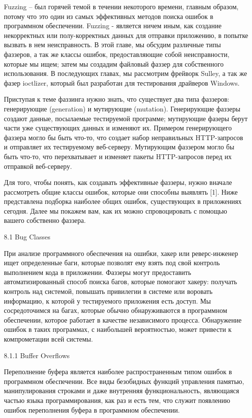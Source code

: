 \documentclass[12pt]{book}
\begin{document}
Fuzzing – был горячей темой в течении некоторого времени, главным образом, потому что это один из самых эффективных методов поиска ошибок в программном обеспечении. Fuzzing - является ничем иным, как создание некорректных или полу-корректных данных для отправки приложению, в попытке вызвать в нем неисправность. В этой главе, мы обсудим различные типы фаззеров, а так же классы ошибок, предоставляющие собой неисправности, которые мы ищем; затем мы создадим файловый фаззер для собственного использования. В последующих главах, мы рассмотрим фрейворк Sulley, а так же фазер ioctlizer, который был разработан для тестирования драйверов Windows.

Приступая к теме фаззинга нужно знать, что существует два типа фаззеров: генерирующие (generation) и мутирующие (mutation). Генерирующие фаззеры создают данные, посылаемые тестируемой программе; мутирующие фазеры берут части уже существующих данных и изменяют их. Примером генерирующего фаззера могло бы быть что-то, что создает набор неправильных HTTP-запросов и отправляет их тестируемому веб-серверу. Мутирующим фаззером могло бы быть что-то, что перехватывает и изменяет пакеты HTTP-запросов перед их отправкой веб-серверу. 

Для того, чтобы понять, как создавать эффективные фаззеры, нужно вначале рассмотреть общие классы ошибок, которые они способны выявлять [1]. Ниже представлена подборка наиболее общих ошибок, существующих в приложениях сегодня. Далее мы покажем вам, как их можно спровоцировать с помощью вашего собственно фаззера. 


8.1 Bug Classes

При анализе программного обеспечения на ошибки, хакер или реверс-инженер ищет определенные баги, которые позволят ему взять под свой контроль выполнением кода в приложении. Фаззеры могут предоставить автоматизированный способ поиска багов, которые помогают хакеру: получать контроль над системой, повышать привилегии в системе или воровать информацию, к которой у тестируемого приложения есть доступ. Мы сосредоточимся на багах, которые обычно обнаруживаются в программном обеспечении, которое работает в качестве независимого процесса. Обнаружение ошибок в таких программах, с наибольшей вероятностью, может привести к компрометации всей системы. 

8.1.1 Buffer Overflows

Переполнение буфера является наиболее распространенным типом ошибок в программном обеспечении. Все виды безобидных функций управления памятью, манипулирования строками и даже внутренняя функциональность, являющаяся частью языка программирования, как раз и есть тем, что служит появлению ошибок переполнения буфера в программном обеспечении.
\end{document}
